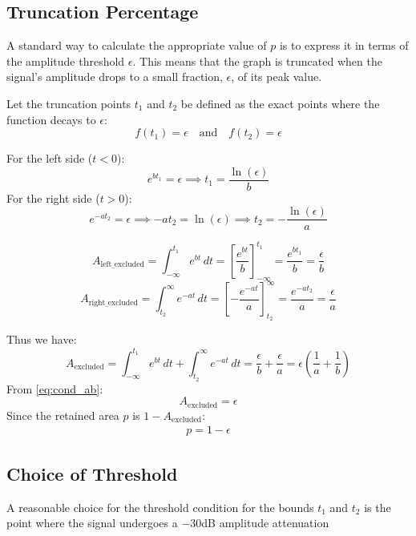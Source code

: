 \documentclass{article}
\numberwithin{equation}{section}
\numberwithin{figure}{section}
\begin{document}

\subsection{Truncation Percentage}
A standard way to calculate the appropriate value of $p$ is to express it in terms of the amplitude threshold $\epsilon$. This means that the graph is truncated when the signal's amplitude drops to a small fraction, $\epsilon$, of its peak value.

Let the truncation points $t_1$ and $t_2$ be defined as the exact points where the function decays to $\epsilon$:
		$$f(t_1) = \epsilon \quad \text{and} \quad f(t_2) = \epsilon$$


\noindent For the left side ($t < 0$):$$e^{bt_1} = \epsilon \implies t_1 = \frac{\ln(\epsilon)}{b}$$For the right side ($t > 0$):$$e^{-at_2} = \epsilon \implies -at_2 = \ln(\epsilon) \implies t_2 = -\frac{\ln(\epsilon)}{a}$$ 



$$A_{\text{left\_excluded}} = \int_{-\infty}^{t_1} e^{bt} \, dt = \left[ \frac{e^{bt}}{b} \right]_{-\infty}^{t_1} = \frac{e^{bt_1}}{b} = \frac{\epsilon}{b}$$$$A_{\text{right\_excluded}} = \int_{t_2}^{\infty} e^{-at} \, dt = \left[ -\frac{e^{-at}}{a} \right]_{t_2}^{\infty} = \frac{e^{-at_2}}{a} = \frac{\epsilon}{a}$$ 

Thus we have:
$$A_{\text{excluded}} = \int_{-\infty}^{t_1} e^{bt} \, dt + \int_{t_2}^{\infty} e^{-at} \, dt = \frac{\epsilon}{b} + \frac{\epsilon}{a} = \epsilon \left( \frac{1}{a} + \frac{1}{b} \right)$$
From \eqref{eq:cond_ab}:
$$A_{\text{excluded}} = \epsilon$$
Since the retained area $p$ is $1 - A_{\text{excluded}}$:
\begin{align}
	p = 1 - \epsilon \label{eq:p_ep}
\end{align}

\subsection{Choice of Threshold}
A reasonable choice for the threshold condition for the bounds $t_1$ and $t_2$ is the point where the signal undergoes a $-30$dB amplitude attenuation
\end{document}
